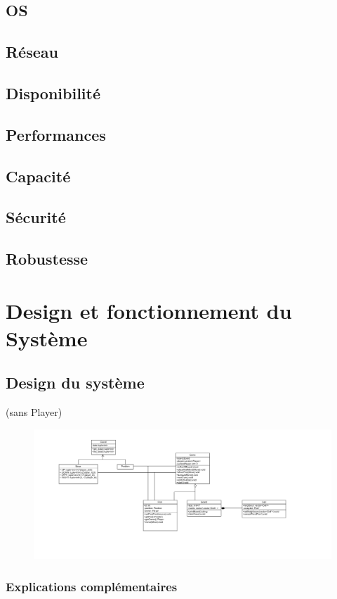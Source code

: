 \documentclass[utf8]{article}
\begin{document}
  \subsection{OS}
  \subsection{Réseau}
  \subsection{Disponibilité}
  \subsection{Performances}
  \subsection{Capacité}
  \subsection{Sécurité}
  \subsection{Robustesse}

\newpage
\section{Design et fonctionnement du Système}
  \subsection{Design du système}
  (sans Player)
  \begin{figure}[H]
    \includegraphics[scale=0.41]{img/MainClassDiagram.png}
  \end{figure}

    \subsubsection{Explications complémentaires}
\end{document}
